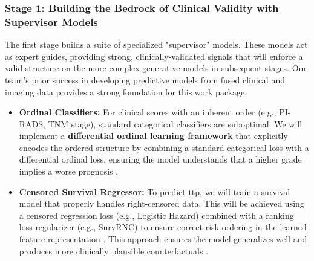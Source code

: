 \documentclass[11pt, a4paper]{article}
\begin{document}
\subsubsection{Stage 1: Building the Bedrock of Clinical Validity with Supervisor Models}
The first stage builds a suite of specialized "supervisor" models. These models act as expert guides, providing strong, clinically-validated signals that will enforce a valid structure on the more complex generative models in subsequent stages. Our team's prior success in developing predictive models from fused clinical and imaging data provides a strong foundation for this work package.
\begin{itemize}
    \item \textbf{Ordinal Classifiers:} For clinical scores with an inherent order (e.g., PI-RADS, TNM stage), standard categorical classifiers are suboptimal. We will implement a \textbf{differential ordinal learning framework} that explicitly encodes the ordered structure by combining a standard categorical loss with a differential ordinal loss, ensuring the model understands that a higher grade implies a worse prognosis \cite{LeeByeon2025, GrisiKartasalo2025}.
    \item \textbf{Censored Survival Regressor:} To predict \gls{ttp}, we will train a survival model that properly handles right-censored data. This will be achieved using a censored regression loss (e.g., Logistic Hazard) combined with a ranking loss regularizer (e.g., SurvRNC) to ensure correct risk ordering in the learned feature representation \cite{GaoLi2019, RivailVogl2023, SaeedRidzuan2024}.
This approach ensures the model generalizes well and produces more clinically plausible counterfactuals \cite{PuglisiAlexander2025, ZhangHager2025}.
\end{itemize}
\end{document}
